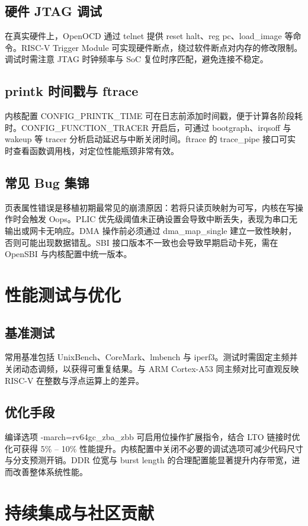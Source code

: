 \section{硬件 JTAG 调试}
在真实硬件上，OpenOCD 通过 telnet 提供 reset halt、reg pc、load\_{}image 等命令。RISC-V Trigger Module 可实现硬件断点，绕过软件断点对内存的修改限制。调试时需注意 JTAG 时钟频率与 SoC 复位时序匹配，避免连接不稳定。\par
\section{printk 时间戳与 ftrace}
内核配置 CONFIG\_{}PRINTK\_{}TIME 可在日志前添加时间戳，便于计算各阶段耗时。CONFIG\_{}FUNCTION\_{}TRACER 开启后，可通过 bootgraph、irqsoff 与 wakeup 等 tracer 分析启动延迟与中断关闭时间。ftrace 的 trace\_{}pipe 接口可实时查看函数调用栈，对定位性能瓶颈非常有效。\par
\section{常见 Bug 集锦}
页表属性错误是移植初期最常见的崩溃原因：若将只读页映射为可写，内核在写操作时会触发 Oops。PLIC 优先级阈值未正确设置会导致中断丢失，表现为串口无输出或网卡无响应。DMA 操作前必须通过 dma\_{}map\_{}single 建立一致性映射，否则可能出现数据错乱。SBI 接口版本不一致也会导致早期启动卡死，需在 OpenSBI 与内核配置中统一版本。\par
\chapter{性能测试与优化}
\section{基准测试}
常用基准包括 UnixBench、CoreMark、lmbench 与 iperf3。测试时需固定主频并关闭动态调频，以获得可重复结果。与 ARM Cortex-A53 同主频对比可直观反映 RISC-V 在整数与浮点运算上的差异。\par
\section{优化手段}
编译选项 -march=rv64gc\_{}zba\_{}zbb 可启用位操作扩展指令，结合 LTO 链接时优化可获得 5\%{} – 10\%{} 性能提升。内核配置中关闭不必要的调试选项可减少代码尺寸与分支预测开销。DDR 位宽与 burst length 的合理配置能显著提升内存带宽，进而改善整体系统性能。\par
\chapter{持续集成与社区贡献}
